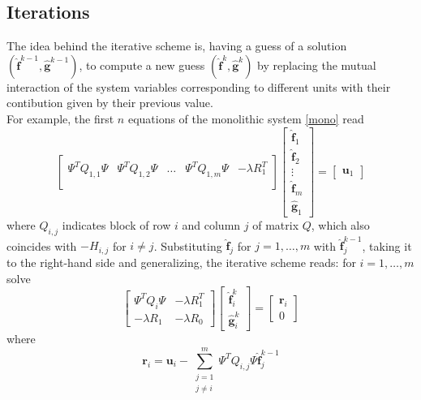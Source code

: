 \subsection{Iterations}
The idea behind the iterative scheme is, having a guess of a solution
$(\hat{\mathbf{f}}^{k-1},\hat{\mathbf{g}}^{k-1})$, to compute a new guess
$(\hat{\mathbf{f}}^k,\hat{\mathbf{g}}^k)$ by replacing the mutual interaction
of the system variables corresponding to different units with their contibution
given by their previous value.\\ For example, the first $n$ equations of the
monolithic system \ref{mono} read
\begin{equation}
	\begin{bmatrix}
		\Psi^TQ_{1,1}\Psi & \Psi^TQ_{1,2}\Psi & \dots & \Psi^TQ_{1,m}\Psi & -\lambda R_1^T \\
	\end{bmatrix}
	\begin{bmatrix}
		\hat{\mathbf{f}}_1 \\
		\hat{\mathbf{f}}_2 \\
		\vdots             \\
		\hat{\mathbf{f}}_m \\
		\hat{\mathbf{g}}_1
	\end{bmatrix}
	=
	\begin{bmatrix}
		\mathbf{u}_1
	\end{bmatrix}
\end{equation}
where $Q_{i,j}$ indicates block of row $i$ and column $j$ of matrix
$Q$, which also coincides with $-H_{i,j}$ for $i \neq j$. Substituting
$\hat{\mathbf{f}}_j$ for $j=1,\dots,m$ with $\hat{\mathbf{f}}_j^{k-1}$, taking
it to the right-hand side and generalizing, the iterative scheme reads: for $i
	= 1, \dots, m$ solve
\begin{equation}
	\begin{bmatrix}
		\Psi^TQ_i\Psi & -\lambda R_1^T \\
		-\lambda R_1  & -\lambda R_0
	\end{bmatrix}
	\begin{bmatrix}
		\hat{\mathbf{f}}_i^k \\
		\hat{\mathbf{g}}_i^k
	\end{bmatrix}
	=
	\begin{bmatrix}
		\mathbf{r}_i \\
		0
	\end{bmatrix}
\end{equation}
where
\begin{equation}
	\mathbf{r}_i =\mathbf{u}_i -\sum_{\substack{j=1\\ j\neq i}}^m \Psi^TQ_{i,j} \Psi \hat{\mathbf{f}}_j^{k-1}
\end{equation}

